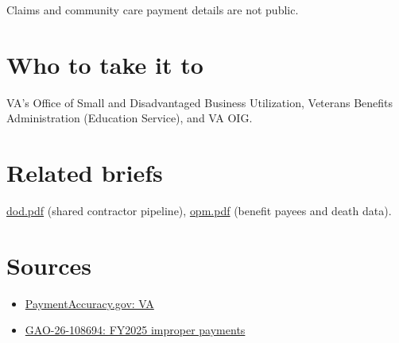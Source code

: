 \documentclass[letterpaper,11pt]{article}
\providecommand{\tightlist}{\setlength{\itemsep}{0pt}\setlength{\parskip}{0pt}}
\begin{document}
Claims and community care payment details are not public.

\hypertarget{who-to-take-it-to}{%
\section{Who to take it to}\label{who-to-take-it-to}}

VA's Office of Small and Disadvantaged Business Utilization, Veterans
Benefits Administration (Education Service), and VA OIG.

\hypertarget{related-briefs}{%
\section{Related briefs}\label{related-briefs}}

\url{dod.pdf} (shared contractor pipeline), \url{opm.pdf} (benefit
payees and death data).

\hypertarget{sources}{%
\section{Sources}\label{sources}}

\begin{itemize}
\tightlist
\item
  \href{https://paymentaccuracy.gov/agency/VA}{PaymentAccuracy.gov: VA}
\item
  \href{https://www.gao.gov/products/gao-26-108694}{GAO-26-108694:
  FY2025 improper payments}
\end{itemize}
\end{document}
